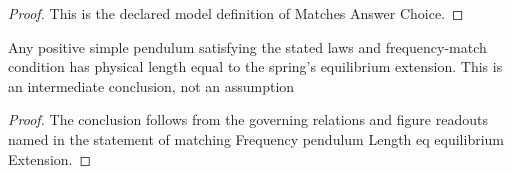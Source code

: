 \begin{proof}
  This is the declared model definition of Matches Answer Choice.
\end{proof}
\begin{lemma}
  \label{lem:physics:phyx-mini-0281:phyxminiproblems-problemphyxmini0281-matchingfrequency-pendulumlength-eq-equilibriumextension}
  Any positive simple pendulum satisfying the stated laws and frequency-match condition has physical length equal to the spring's equilibrium extension. This is an intermediate conclusion, not an assumption
\end{lemma}
\begin{proof}
  The conclusion follows from the governing relations and figure readouts named in the statement of matching Frequency pendulum Length eq equilibrium Extension.
\end{proof}

